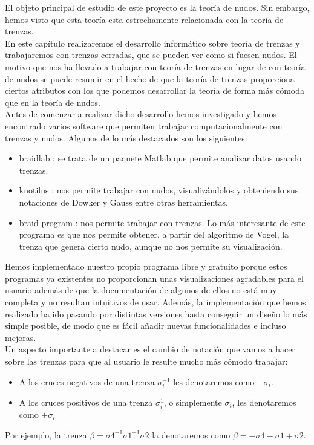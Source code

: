 El objeto principal de estudio de este proyecto es la teoría de nudos. Sin embargo, hemos visto que esta teoría esta estrechamente relacionada con la teoría de trenzas.\\ En este capítulo realizaremos el desarrollo informático sobre teoría de trenzas y trabajaremos con trenzas cerradas, que se pueden ver como si fuesen nudos. El motivo que nos ha llevado a trabajar con teoría de trenzas en lugar de con teoría de nudos se puede resumir en el hecho de que la teoría de trenzas proporciona ciertos atributos con los que podemos desarrollar la teoría de forma más cómoda que en la teoría de nudos. \\

Antes de comenzar a realizar dicho desarrollo hemos investigado y hemos encontrado varios software que permiten trabajar computacionalmente con trenzas y nudos. Algunos de lo más destacados son los siguientes:
\begin{itemize}
	\item braidlab \cite{9}: se trata de un paquete Matlab que permite analizar datos usando trenzas. 
	\item knotilus \cite{8}: nos permite trabajar con nudos, visualizándolos y obteniendo sus notaciones de Dowker y Gauss entre otras herramientas.
	\item braid program \cite{7}: nos permite trabajar con trenzas. Lo más interesante de este programa es que nos permite obtener, a partir del algoritmo de Vogel, la trenza que genera cierto nudo, aunque no nos permite su visualización. 
\end{itemize}

Hemos implementado nuestro propio programa libre y gratuito porque estos programas ya existentes no proporcionan unas visualizaciones agradables para el usuario además de que la documentación de algunos de ellos no está muy completa y no resultan intuitivos de usar. Además, la implementación que hemos realizado ha ido pasando por distintas versiones hasta conseguir un diseño lo más simple posible, de modo que es fácil añadir nuevas funcionalidades e incluso mejoras. \\

Un aspecto importante a destacar es el cambio de notación que vamos a hacer sobre las trenzas para que al usuario le resulte mucho más cómodo trabajar:
\begin{itemize}
	\item A los cruces negativos de una trenza $ \sigma_{i}^{-1} $ les denotaremos como $ -\sigma_{i}$.
	\item A los cruces positivos de una trenza $ \sigma_{i}^{1} $, o simplemente $ \sigma_{i} $, les denotaremos como $ +\sigma_{i} $
\end{itemize}

Por ejemplo, la trenza $\beta = \sigma4^{-1}\sigma1^{-1}\sigma2$ la denotaremos como $\beta = -\sigma4-\sigma1+\sigma2$.\\ 

